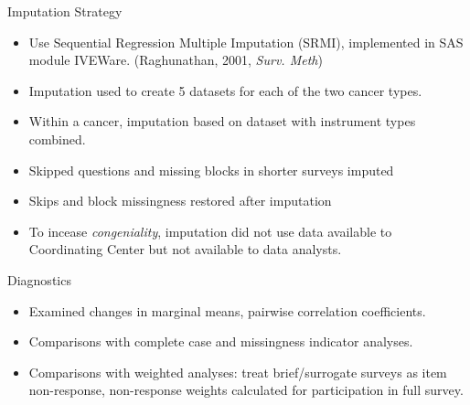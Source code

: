 \documentclass[11pt,handout]{beamer}
\begin{document}
\begin{frame}{Imputation Strategy}

  \begin{itemize}
     
     \item Use Sequential Regression Multiple Imputation (SRMI), implemented in SAS module IVEWare. (Raghunathan, 2001, \textsl{Surv. Meth})
     
     \item Imputation used to create 5 datasets for each of the two cancer types.
     
     \item Within a cancer, imputation based on dataset with instrument types combined.
     
     \item Skipped questions and missing blocks in shorter surveys imputed
     
     \item Skips and block missingness restored after imputation
     
     \item To incease \textsl{congeniality}, imputation did not use data available to Coordinating Center but not available to data analysts.
     
  \end{itemize}

	
\end{frame}

\begin{frame}{Diagnostics}

\begin{itemize}

  \item Examined changes in marginal means, pairwise correlation coefficients.

  \item Comparisons with complete case and missingness indicator analyses.
  
  \item Comparisons with weighted analyses: treat brief/surrogate surveys as item non-response, non-response weights calculated for participation in full survey.
  

\end{itemize}
	
\end{frame}
\end{document}
